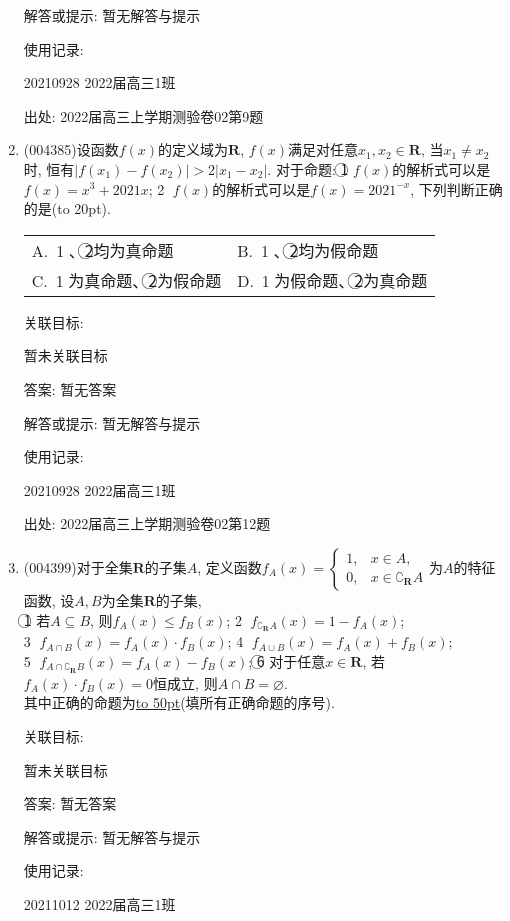 \documentclass[10pt,a4paper]{article}
\newcommand{\blank}[1]{\underline{\hbox to #1pt{}}}
\newcommand{\bracket}[1]{(\hbox to #1pt{})}
\newcommand{\twoch}[4]{\par\begin{tabular}{p{.46\textwidth}p{.46\textwidth}}
A.~#1& B.~#2\\
C.~#3& D.~#4
\end{tabular}}
\begin{document}
\begin{enumerate}[1.]
解答或提示: 暂无解答与提示

使用记录:

20210928	2022届高三1班	


出处: 2022届高三上学期测验卷02第9题
\item { (004385)}设函数$f(x)$的定义域为$\mathbf{R}$, $f(x)$满足对任意$x_1,x_2\in \mathbf{R}$, 当$x_1\ne x_2$时, 恒有$|f(x_1)-f(x_2)|>2|x_1-x_2|$. 对于命题: \textcircled{1} $f(x)$的解析式可以是$f(x)=x^3+2021x$; \textcircled{2} $f(x)$的解析式可以是$f(x)=2021^{-x}$, 下列判断正确的是\bracket{20}.
\twoch{\textcircled{1}、\textcircled{2}均为真命题}{\textcircled{1}、\textcircled{2}均为假命题}{\textcircled{1}为真命题、\textcircled{2}为假命题}{\textcircled{1}为假命题、\textcircled{2}为真命题}


关联目标:

暂未关联目标

答案: 暂无答案

解答或提示: 暂无解答与提示

使用记录:

20210928	2022届高三1班	


出处: 2022届高三上学期测验卷02第12题
\item { (004399)}对于全集$\mathbf{R}$的子集$A$, 定义函数$f_A(x)=\begin{cases}
1, &  x\in A,  \\0, & x\in \complement_{\mathbf{R}}A  \end{cases}$为$A$的特征函数, 设$A,B$为全集$\mathbf{R}$的子集,\\
\textcircled{1} 若$A\subseteq B$, 则$f_A(x)\le f_B(x)$; \textcircled{2} $f_{\complement_{\mathbf{R}}A}(x)=1-f_A(x)$;\\
\textcircled{3} ${f_{A\cap B}}(x)=f_A(x)\cdot f_B(x)$; \textcircled{4} $f_{A\cup B}(x)=f_A(x)+f_B(x)$;\\ \textcircled{5} $f_{A\cap \complement_\mathbf{R}B}(x)=f_A(x)-f_B(x)$; \textcircled{6} 对于任意$x\in \mathbf{R}$, 若$f_A(x)\cdot f_B(x)=0$恒成立, 则$A\cap B=\varnothing$.\\
其中正确的命题为\blank{50}(填所有正确命题的序号).


关联目标:

暂未关联目标

答案: 暂无答案

解答或提示: 暂无解答与提示

使用记录:

20211012	2022届高三1班	



\end{enumerate}
\end{document}
